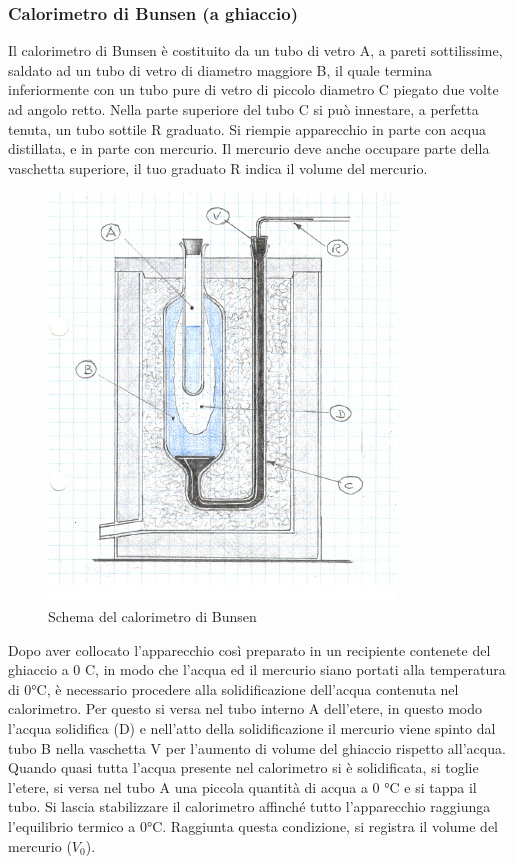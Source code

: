 \documentclass[10pt,a4paper]{article}
\begin{document}
\subsubsection*{Calorimetro di Bunsen (a ghiaccio)}
Il calorimetro di Bunsen è costituito da un tubo di vetro A, a pareti sottilissime, saldato ad un tubo di vetro di diametro maggiore B, il quale termina inferiormente con un tubo pure di vetro di piccolo diametro C piegato due volte ad angolo retto. Nella parte superiore del tubo C si può innestare, a perfetta tenuta, un tubo sottile R graduato. Si riempie apparecchio in parte con acqua distillata, e in parte con mercurio. Il mercurio deve anche occupare parte della vaschetta superiore, il tuo graduato R indica il volume del mercurio.
\begin{figure}[h!]
	\centering
	\includegraphics[width=0.5\linewidth]{../images/calorimetro_bunsen}
	\caption{Schema del calorimetro di Bunsen}
	\label{fig:calorimetrobunsen}
\end{figure}
\FloatBarrier
Dopo aver collocato l’apparecchio così preparato in un recipiente contenete del ghiaccio a 0 \textdegree C, in modo che l’acqua ed il mercurio siano portati alla temperatura di 0°C, è necessario procedere alla solidificazione dell’acqua contenuta nel calorimetro. Per questo si versa nel tubo interno A dell’etere, in questo modo l’acqua solidifica (D) e nell’atto della solidificazione il mercurio viene spinto dal tubo B nella vaschetta V per l’aumento di volume del ghiaccio rispetto all'acqua. Quando quasi tutta l’acqua presente nel calorimetro si è solidificata, si toglie l’etere, si versa nel tubo A una piccola quantità di acqua a 0 °C e si tappa il tubo. Si lascia stabilizzare il calorimetro affinché tutto l’apparecchio raggiunga l’equilibrio termico a 0°C. Raggiunta questa condizione, si registra il volume del mercurio ($V_0$).\\
\end{document}

